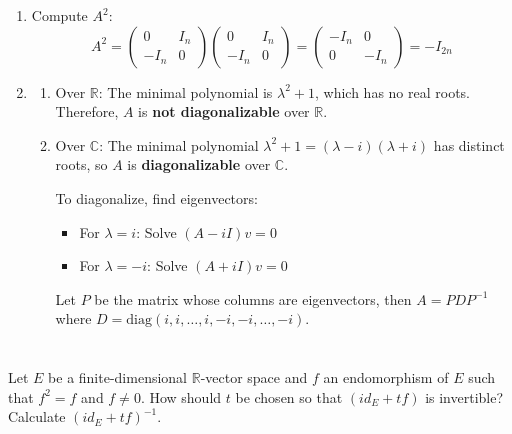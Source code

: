 \documentclass[12pt]{article}
\begin{document}
\begin{correctionbox}
\begin{enumerate}
    \item Compute $A^2$:
$$A^2 = \begin{pmatrix}0 & I_n \\ -I_n & 0\end{pmatrix}\begin{pmatrix}0 & I_n \\ -I_n & 0\end{pmatrix} = \begin{pmatrix}-I_n & 0 \\ 0 & -I_n\end{pmatrix} = -I_{2n}$$

    \item
    \begin{enumerate}
    \item Over $\mathbb{R}$: The minimal polynomial is $\lambda^2 + 1$, which has no real roots. Therefore, $A$ is \textbf{not diagonalizable} over $\mathbb{R}$.

    \item Over $\mathbb{C}$: The minimal polynomial $\lambda^2 + 1 = (\lambda - i)(\lambda + i)$ has distinct roots, so $A$ is \textbf{diagonalizable} over $\mathbb{C}$.

To diagonalize, find eigenvectors:
\begin{itemize}
    \item For $\lambda = i$: Solve $(A - iI)v = 0$
    \item For $\lambda = -i$: Solve $(A + iI)v = 0$
\end{itemize}

Let $P$ be the matrix whose columns are eigenvectors, then $A = PDP^{-1}$ where $D = \text{diag}(i, i, \ldots, i, -i, -i, \ldots, -i)$.
\end{enumerate}
\end{enumerate}
\end{correctionbox}

\newpage
\section{}
Let $E$ be a finite-dimensional $\mathbb{R}$-vector space and $f$ an endomorphism of $E$ such that $f^{2}=f$ and $f \ne0$. How should $t$ be chosen so that $(id_{E}+tf)$ is invertible? Calculate $(id_{E}+tf)^{-1}$.
\end{document}
